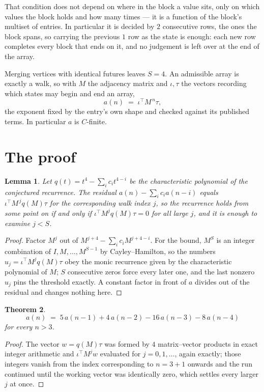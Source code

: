 \documentclass[11pt,a4paper]{article}
\theoremstyle{plain}
\newtheorem{theorem}{Theorem}
\newtheorem{lemma}[theorem]{Lemma}
\theoremstyle{definition}
\begin{document}
That condition does not depend on where in the block a value sits, only on which values the block holds and how many times --- it is a function of the block's multiset of entries. In particular it is decided by $2$ consecutive rows, the ones the block spans, so carrying the previous $1$ row as the state is enough: each new row completes every block that ends on it, and no judgement is left over at the end of the array.

Merging vertices with identical futures leaves $S=4$. An admissible array is exactly a walk, so with $M$ the adjacency matrix and $\iota,\tau$ the vectors recording which states may begin and end an array,
\[
a(n)\;=\;\iota^{\!\top}M^{\,n}\tau ,
\]
the exponent fixed by the entry's own shape and checked against its published terms. In
particular $a$ is $C$-finite.

\section{The proof}

\begin{lemma}\label{lem:crit}
Let $q(t)=t^{4}-\sum_i c_it^{4-i}$ be the characteristic polynomial of the
conjectured recurrence. The residual $a(n)-\sum_ic_ia(n-i)$ equals
$\iota^{\!\top}M^{\,j}q(M)\tau$ for the corresponding walk index $j$, so the recurrence
holds from some point on if and only if $\iota^{\!\top}M^{j}q(M)\tau=0$ for all large $j$,
and it is enough to examine $j<S$.
\end{lemma}

\begin{proof}
Factor $M^{j}$ out of $M^{j+4}-\sum_ic_iM^{j+4-i}$. For the bound, $M^{S}$
is an integer combination of $I,M,\dots,M^{S-1}$ by Cayley--Hamilton, so the numbers
$u_j=\iota^{\!\top}M^{j}q(M)\tau$ obey the monic recurrence given by the characteristic
polynomial of $M$; $S$ consecutive zeros force every later one, and the last nonzero $u_j$
pins the threshold exactly. A constant factor in front of $a$ divides out of the residual and
changes nothing here.
\end{proof}

\begin{theorem}
\[
a(n)\;=\;5\,a(n-1) + 4\,a(n-2) - 16\,a(n-3) - 8\,a(n-4)
\]
for every $n>3$.
\end{theorem}

\begin{proof}
The vector $w=q(M)\tau$ was formed by $4$ matrix--vector products in exact integer
arithmetic and $\iota^{\!\top}M^{j}w$ evaluated for $j=0,1,\dots$, again exactly; those
integers vanish from the index corresponding to $n=3+1$ onwards and the run continued
until the working vector was identically zero, which settles every larger $j$ at once.
\end{proof}
\end{document}
